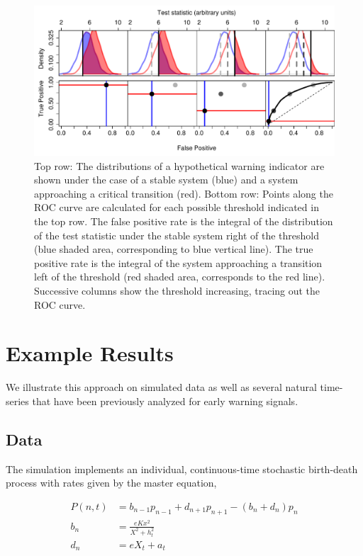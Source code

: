 \documentclass[authoryear,review,11pt]{elsarticle}
\begin{document}
\begin{figure}
   \begin{center}
     \includegraphics[width=\linewidth]{figures/Fig1.pdf}
     \caption{Top row: The distributions of a hypothetical warning indicator are shown under the case of a stable system (blue) and a system approaching a critical transition (red).  Bottom row: Points along the ROC curve are calculated for each possible threshold indicated in the top row.  The false positive rate is the integral of the distribution of the test statistic under the stable system right of the threshold (blue shaded area, corresponding to blue vertical line).  The true positive rate is the integral of the system approaching a transition left of the threshold (red shaded area, corresponds to the red line).  Successive columns show the threshold increasing, tracing out the ROC curve.}
     \label{fig:roc_intro}
  \end{center}
 \end{figure}





\section{Example Results}
We illustrate this approach on simulated data as well as several natural time-series that have been previously analyzed for early warning signals.  

\subsection*{Data}
The simulation implements an individual, continuous-time stochastic birth-death process with rates given by the master equation,

\begin{align}
    P(n,t) &= b_{n-1} p_{n-1} + d_{n+1}p_{n+1} - (b_n+d_n)p_n  \label{master} \\ 
    b_n &= \frac{e K x^2}{X^2 + h_t^2} \\ 
    d_n &= e X_t + a_t   
\end{align}
\end{document}

